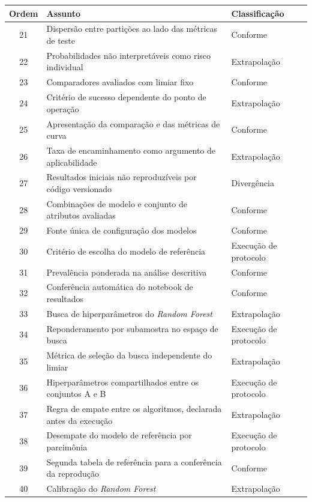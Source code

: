 \begin{quadro}[H]
  \caption{\label{qua:decisoes-2}Índice das decisões de implementação, parte 2 de 3.}
  \small
  \begin{tabular}{|c|p{9.2cm}|p{4.2cm}|}
    \hline
    \textbf{Ordem} & \textbf{Assunto} & \textbf{Classificação} \\ \hline
    21 & Dispersão entre partições ao lado das métricas de teste & Conforme \\ \hline
    22 & Probabilidades não interpretáveis como risco individual & Extrapolação \\ \hline
    23 & Comparadores avaliados com limiar fixo & Conforme \\ \hline
    24 & Critério de sucesso dependente do ponto de operação & Extrapolação \\ \hline
    25 & Apresentação da comparação e das métricas de curva & Conforme \\ \hline
    26 & Taxa de encaminhamento como argumento de aplicabilidade & Extrapolação \\ \hline
    27 & Resultados iniciais não reproduzíveis por código versionado & Divergência \\ \hline
    28 & Combinações de modelo e conjunto de atributos avaliadas & Conforme \\ \hline
    29 & Fonte única de configuração dos modelos & Conforme \\ \hline
    30 & Critério de escolha do modelo de referência & Execução de protocolo \\ \hline
    31 & Prevalência ponderada na análise descritiva & Conforme \\ \hline
    32 & Conferência automática do notebook de resultados & Conforme \\ \hline
    33 & Busca de hiperparâmetros do \textit{Random Forest} & Extrapolação \\ \hline
    34 & Reponderamento por subamostra no espaço de busca & Execução de protocolo \\ \hline
    35 & Métrica de seleção da busca independente do limiar & Extrapolação \\ \hline
    36 & Hiperparâmetros compartilhados entre os conjuntos A e B & Execução de protocolo \\ \hline
    37 & Regra de empate entre os algoritmos, declarada antes da execução & Extrapolação \\ \hline
    38 & Desempate do modelo de referência por parcimônia & Execução de protocolo \\ \hline
    39 & Segunda tabela de referência para a conferência da reprodução & Conforme \\ \hline
    40 & Calibração do \textit{Random Forest} & Extrapolação \\ \hline
  \end{tabular}
\end{quadro}

